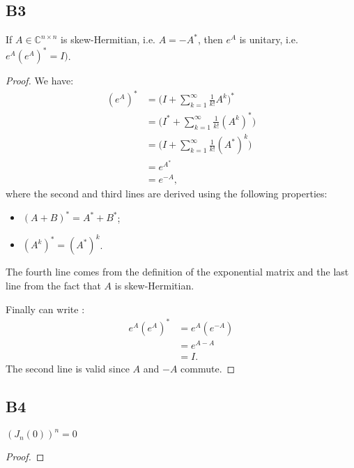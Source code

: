 \documentclass[11pt]{article}
\newcommand{\complex}{\mathbb{C}} %
\begin{document}
\subsection*{B3}
If \(A \in \complex^{n \times n}\) is skew-Hermitian, i.e. $A=-A^*$, then $e^A$ is unitary, i.e. $e^A(e^A)^*=I)$.
\begin{proof}
We have:
\begin{align*}
    (e^A)^*&=\Bigg(I+\sum^{\infty}_{k=1}\frac{1}{k!}A^k\Bigg)^{*}\\
    &=\Bigg(I^{*}+\sum^{\infty}_{k=1}\frac{1}{k!}(A^k)^{*}\Bigg)\\
    &=\Bigg(I+\sum^{\infty}_{k=1}\frac{1}{k!}(A^{*})^k\Bigg)\\
    &=e^{A^{*}}\\
    &=e^{-A},
\end{align*}
where the second and third lines are derived using the following properties:
\begin{itemize}
    \item $(A+B)^{*}=A^{*}+B^{*}$;
    \item $(A^k)^*=(A^*)^k$.
\end{itemize}
The fourth line comes from the definition of the exponential matrix and the last line from the fact that \(A\) is skew-Hermitian.

Finally can write :
\begin{align*}
    e^A(e^A)^*&=e^A(e^{-A})\\
    &=e^{A-A}\\
    &=I.
\end{align*}
The second line is valid since \(A\) and \(-A\) commute.
\end{proof}

\subsection*{B4}
$(J_n(0))^n=0$
\begin{proof}
\end{proof}
\end{document}
